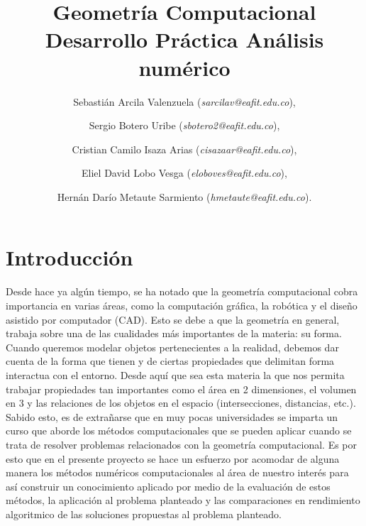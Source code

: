 \documentclass[final, 12pt letterpaper]{article}
\begin{document}
\title{Geometría Computacional \\
       Desarrollo Práctica  Análisis numérico}
\author{Sebastián Arcila Valenzuela (\textit{sarcilav@eafit.edu.co}),
\and{} Sergio Botero Uribe (\textit{sbotero2@eafit.edu.co}), 
\and{} Cristian Camilo Isaza Arias (\textit{cisazaar@eafit.edu.co}),
\and{} Eliel David Lobo Vesga (\textit{eloboves@eafit.edu.co}), 
\and{} Hernán Darío Metaute Sarmiento (\textit{hmetaute@eafit.edu.co}).
}
\maketitle      
\section{Introducción}
Desde hace ya algún tiempo, se ha notado que la geometría computacional cobra importancia en varias áreas, como la computación gráfica, la robótica y el diseño asistido por computador (CAD). Esto se debe a que la geometría en general, trabaja sobre una de las cualidades más importantes de la materia: su forma. Cuando queremos modelar objetos pertenecientes a la realidad, debemos dar cuenta de la forma que tienen y de ciertas propiedades que delimitan forma interactua con el entorno. Desde aquí que sea esta materia la que nos permita trabajar propiedades tan importantes como el área en 2 dimensiones, el volumen en 3 y las relaciones de los objetos en el espacio (intersecciones, distancias, etc.). Sabido esto, es de extrañarse que en muy pocas universidades se imparta un curso que aborde los métodos computacionales que se pueden aplicar cuando se trata de resolver problemas relacionados con la geometría computacional.  Es por esto que en el presente proyecto se hace un esfuerzo por acomodar de alguna manera los métodos numéricos computacionales al área de nuestro interés para así construir un conocimiento aplicado por medio de la evaluación de estos métodos, la aplicación al problema planteado y las comparaciones en rendimiento algoritmico de las soluciones propuestas al problema planteado.
\end{document}
